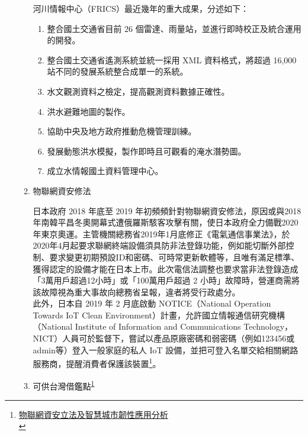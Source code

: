 \documentclass[a4paper,12pt]{article}
\begin{document}
\begin{enumerate}
\begin{enumerate}
河川情報中心（FRICS）最近幾年的重大成果，分述如下：\\
\begin{enumerate}
\item 整合國土交通省目前 26 個雷達、雨量站，並進行即時校正及統合運用的開發。\\
\item 整合國土交通省遙測系統並統一採用 XML 資料格式，將超過 16,000 站不同的發展系統整合成單一的系統。\\
\item 水文觀測資料之檢定，提高觀測資料數據正確性。\\
\item 洪水避難地圖的製作。\\
\item 協助中央及地方政府推動危機管理訓練。\\
\item 發展動態洪水模擬，製作即時且可觀看的淹水潛勢圖。\\
\item 成立水情報國土資料管理中心。\\
\end{enumerate}

\item 物聯網資安修法
\label{sec:orgd67bdcf}

日本政府 2018 年底至 2019 年初頻頻針對物聯網資安修法，原因或與2018年南韓平昌冬奧開幕式遭俄羅斯駭客攻擊有關，使日本政府全力備戰2020年東京奧運。主管機關總務省2019年1月底修正《電氣通信事業法》，於2020年4月起要求聯網終端設備須具防非法登錄功能，例如能切斷外部控制、要求變更初期預設ID和密碼、可時常更新軟體等，且唯有滿足標準、獲得認定的設備才能在日本上市。此次電信法調整也要求當非法登錄造成「3萬用戶超過12小時」或「100萬用戶超過 2 小時」故障時，營運商需將該故障視為重大事故向總務省呈報，違者將受行政處分。\\

此外，日本自 2019 年 2 月底啟動 NOTICE（National Operation Towards IoT Clean Environment）計畫，允許國立情報通信研究機構（National Institute of Information and Communications Technology，NICT）人員可於監督下，嘗試以產品原廠密碼和弱密碼（例如123456或admin等）登入一般家庭的私人 IoT 設備，並把可登入名單交給相關網路服務商，提醒消費者保護該裝置\footnote{\href{https://technews.tw/2019/04/17/iot-law-and-resilient-cities/}{物聯網資安立法及智慧城市韌性應用分析}\\\label{org3b2ba70}}。\\

\item 可供台灣借鑑點\textsuperscript{\ref{org3b2ba70}}
\label{sec:orgdab1b91}


\end{enumerate}
\end{enumerate}
\end{document}
